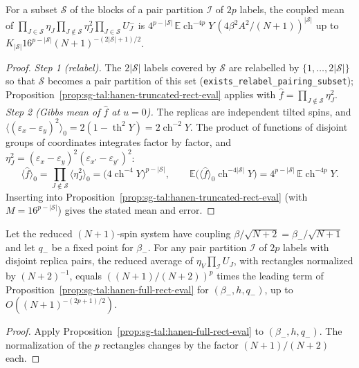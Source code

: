 \begin{lemma}\label{lem:sg-tal:hanen-subset-term}
\leanok
{}
For a subset $\mathcal S$ of the blocks of a pair partition $\mathcal I$ of $2p$ labels, the coupled mean of
$\prod_{J\in\mathcal S}\eta_J\prod_{J\notin\mathcal S}\eta_J^2\prod_{J\in\mathcal S}U_J^-$ is
$4^{p-|\mathcal S|}\,\mathbb E\operatorname{ch}^{-4p}Y\,(4\beta^2A^2/(N+1))^{|\mathcal S|}$ up to $K_{|\mathcal S|}16^{p-|\mathcal S|}(N+1)^{-(2|\mathcal S|+1)/2}$.
\end{lemma}
\begin{proof}
\leanok
\emph{Step 1 (relabel).} The $2|\mathcal S|$ labels covered by $\mathcal S$ are relabelled by $\{1,\dots,2|\mathcal S|\}$ so that $\mathcal S$ becomes a pair partition of this set (\texttt{exists\_relabel\_pairing\_subset}); Proposition~\ref{prop:sg-tal:hanen-truncated-rect-eval} applies with $\hat f=\prod_{J\notin\mathcal S}\eta_J^2$.
\emph{Step 2 (Gibbs mean of $\hat f$ at $u=0$).} The replicas are independent tilted spins, and $\langle(\varepsilon_x-\varepsilon_y)^2\rangle_0=2(1-\operatorname{th}^2Y)=2\operatorname{ch}^{-2}Y$. The product of functions of disjoint groups of coordinates integrates factor by factor, and $\eta_J^2=(\varepsilon_{x}-\varepsilon_{y})^2(\varepsilon_{x'}-\varepsilon_{y'})^2$:
\[
\langle\hat f\rangle_0=\prod_{J\notin\mathcal S}\langle\eta_J^2\rangle_0=\big(4\operatorname{ch}^{-4}Y\big)^{p-|\mathcal S|},\qquad
\mathbb E\big(\langle\hat f\rangle_0\operatorname{ch}^{-4|\mathcal S|}Y\big)=4^{p-|\mathcal S|}\,\mathbb E\operatorname{ch}^{-4p}Y .
\]
Inserting into Proposition~\ref{prop:sg-tal:hanen-truncated-rect-eval} (with $M=16^{p-|\mathcal S|}$) gives the stated mean and error.
\end{proof}

\begin{lemma}\label{lem:sg-tal:hanen-reduced-eval}
\leanok
{}
Let the reduced $(N+1)$-spin system have coupling $\beta/\sqrt{N+2}=\beta_-/\sqrt{N+1}$ and let $q_-$ be a fixed point for $\beta_-$.
For any pair partition $\mathcal I$ of $2p$ labels with disjoint replica pairs, the reduced average of $\eta_V\prod_{\mathcal I}U_J$, with rectangles normalized by $(N+2)^{-1}$,
equals $((N+1)/(N+2))^p$ times the leading term of Proposition~\ref{prop:sg-tal:hanen-full-rect-eval} for $(\beta_-,h,q_-)$, up to $O((N+1)^{-(2p+1)/2})$.
\end{lemma}
\begin{proof}
\leanok
Apply Proposition~\ref{prop:sg-tal:hanen-full-rect-eval} to $(\beta_-,h,q_-)$. The normalization of the $p$ rectangles changes by the factor $(N+1)/(N+2)$ each.
\end{proof}

